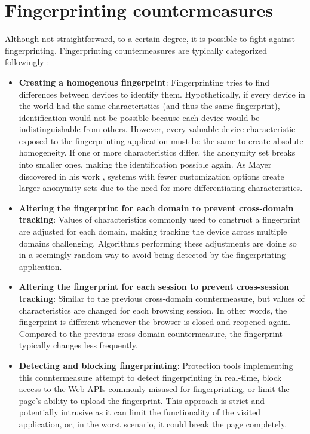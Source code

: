 \section{Fingerprinting countermeasures}
\label{Section:FingerprintingCounter}

Although not straightforward, to a certain degree, it is possible to fight against fingerprinting. Fingerprinting countermeasures are typically categorized followingly \cite{JShelterPaper, PriVaricator}:

\begin{itemize}
	\item \textbf{Creating a homogenous fingerprint}: Fingerprinting tries to find differences between devices to identify them. Hypothetically, if every device in the world had the same characteristics (and thus the same fingerprint), identification would not be possible because each device would be indistinguishable from others. However, every valuable device characteristic exposed to the fingerprinting application must be the same to create absolute homogeneity. If one or more characteristics differ, the anonymity set breaks into smaller ones, making the identification possible again. As Mayer discovered in his work \cite{MayerAnyPerson}, systems with fewer customization options create larger anonymity sets due to the need for more differentiating characteristics.
	\item \textbf{Altering the fingerprint for each domain to prevent cross-domain tracking}: Values of characteristics commonly used to construct a fingerprint are adjusted for each domain, making tracking the device across multiple domains challenging. Algorithms performing these adjustments are doing so in a seemingly random way to avoid being detected by the fingerprinting application.
	\item \textbf{Altering the fingerprint for each session to prevent cross-session tracking}: Similar to the previous cross-domain countermeasure, but values of characteristics are changed for each browsing session. In other words, the fingerprint is different whenever the browser is closed and reopened again. Compared to the previous cross-domain countermeasure, the fingerprint typically changes less frequently.
	\item \textbf{Detecting and blocking fingerprinting}: Protection tools implementing this countermeasure attempt to detect fingerprinting in real-time, block access to the Web APIs commonly misused for fingerprinting, or limit the page's ability to upload the fingerprint. This approach is strict and potentially intrusive as it can limit the functionality of the visited application, or, in the worst scenario, it could break the page completely.
\end{itemize}

